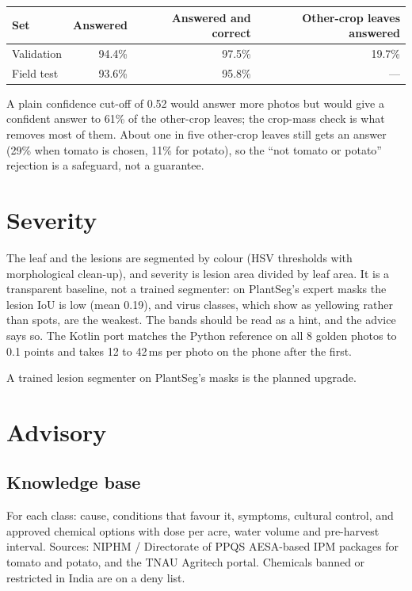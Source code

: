 \documentclass[11pt,a4paper]{article}
\newcommand{\hdr}[1]{\textbf{#1}}
\begin{document}
\begin{table}[H]
\centering
\begin{tabular}{@{}lrrr@{}}
\toprule
\hdr{Set} & \hdr{Answered} & \hdr{Answered and correct} & \hdr{Other-crop leaves answered} \\
\midrule
Validation & 94.4\% & 97.5\% & 19.7\% \\
Field test & 93.6\% & 95.8\% & --- \\
\bottomrule
\end{tabular}
\end{table}

A plain confidence cut-off of 0.52 would answer more photos but would give a
confident answer to 61\% of the other-crop leaves; the crop-mass check is what
removes most of them. About one in five other-crop leaves still gets an answer
(29\% when tomato is chosen, 11\% for potato), so the ``not tomato or potato''
rejection is a safeguard, not a guarantee.

\section{Severity}

The leaf and the lesions are segmented by colour (HSV thresholds with
morphological clean-up), and severity is lesion area divided by leaf area. It is a
transparent baseline, not a trained segmenter: on PlantSeg's expert masks the
lesion IoU is low (mean 0.19), and virus classes, which show as yellowing rather
than spots, are the weakest. The bands should be read as a hint, and the advice
says so. The Kotlin port matches the Python reference on all 8 golden photos to
0.1 points and takes 12 to 42\,ms per photo on the phone after the first.

A trained lesion segmenter on PlantSeg's masks is the planned upgrade.

\section{Advisory}

\subsection{Knowledge base}

For each class: cause, conditions that favour it, symptoms, cultural control, and
approved chemical options with dose per acre, water volume and pre-harvest
interval. Sources: NIPHM / Directorate of PPQS AESA-based IPM packages for tomato
and potato, and the TNAU Agritech portal. Chemicals banned or restricted in India
are on a deny list.
\end{document}
